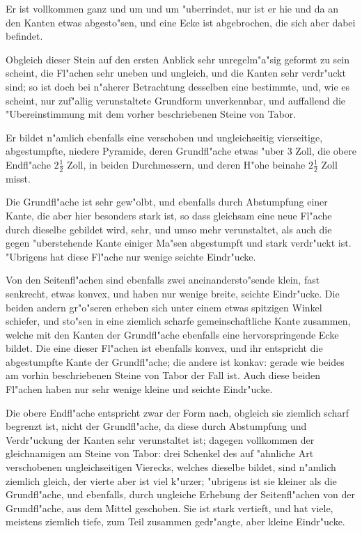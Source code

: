 \documentclass[a4paper, 11pt, oneside, german]{article}
\begin{document}
Er ist vollkommen ganz und um und um "uberrindet, nur ist er hie und da an den Kanten etwas abgesto"sen, und eine Ecke ist abgebrochen, die sich aber dabei befindet.

Obgleich dieser Stein auf den ersten Anblick sehr unregelm"a"sig geformt zu sein scheint, die Fl"achen sehr uneben und ungleich, und die Kanten sehr verdr"uckt sind; so ist doch bei n"aherer Betrachtung desselben eine bestimmte, und, wie es scheint, nur zuf"allig verunstaltete Grundform unverkennbar, und auffallend die "Ubereinstimmung mit dem vorher beschriebenen Steine von Tabor.

Er bildet n"amlich ebenfalls eine verschoben und ungleichseitig vierseitige, abgestumpfte, niedere Pyramide, deren Grundfl"ache etwas "uber 3 Zoll, die obere Endfl"ache $2\frac{1}{2}$ Zoll, in beiden Durchmessern, und deren H"ohe beinahe $2\frac{1}{2}$ Zoll misst.

Die Grundfl"ache ist sehr gew"olbt, und ebenfalls durch Abstumpfung einer Kante, die aber hier besonders stark ist, so dass gleichsam eine neue Fl"ache durch dieselbe gebildet wird, sehr, und umso mehr verunstaltet, als auch die gegen "uberstehende Kante einiger Ma"sen abgestumpft und stark verdr"uckt ist. "Ubrigens hat diese Fl"ache nur wenige seichte Eindr"ucke.

Von den Seitenfl"achen sind ebenfalls zwei aneinandersto"sende klein, fast senkrecht, etwas konvex, und haben nur wenige breite, seichte Eindr"ucke. Die beiden andern gr"o"seren erheben sich unter einem etwas spitzigen Winkel schiefer, und sto"sen in eine ziemlich scharfe gemeinschaftliche Kante zusammen, welche mit den Kanten der Grundfl"ache ebenfalls eine hervorspringende Ecke bildet. Die eine dieser Fl"achen ist ebenfalls konvex, und ihr entspricht die abgestumpfte Kante der Grundfl"ache; die andere ist konkav: gerade wie beides am vorhin beschriebenen Steine von Tabor der Fall ist. Auch diese beiden Fl"achen haben nur sehr wenige kleine und seichte Eindr"ucke.

Die obere Endfl"ache entspricht zwar der Form nach, obgleich sie ziemlich scharf begrenzt ist, nicht der Grundfl"ache, da diese durch Abstumpfung und Verdr"uckung der Kanten sehr verunstaltet ist; dagegen vollkommen der gleichnamigen am Steine von Tabor: drei Schenkel des auf "ahnliche Art verschobenen ungleichseitigen Vierecks, welches dieselbe bildet, sind n"amlich ziemlich gleich, der vierte aber ist viel k"urzer; "ubrigens ist sie kleiner als die Grundfl"ache, und ebenfalls, durch ungleiche Erhebung der Seitenfl"achen von der Grundfl"ache, aus dem Mittel geschoben. Sie ist stark vertieft, und hat viele, meistens ziemlich tiefe, zum Teil zusammen gedr"angte, aber kleine Eindr"ucke.
\end{document}

